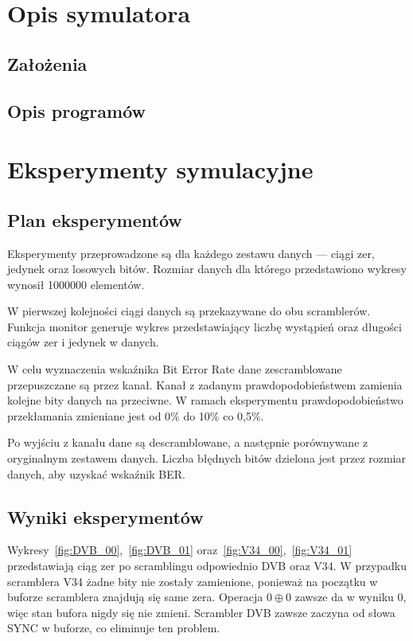 \documentclass[polish, 11pt]{article}
\begin{document}
\section{Opis symulatora}
    \subsection{Założenia}

    \subsection{Opis programów}

\section{Eksperymenty symulacyjne}
    \subsection{Plan eksperymentów}
        Eksperymenty przeprowadzone są dla każdego zestawu danych --- ciągi zer, jedynek oraz losowych bitów.
        Rozmiar danych dla którego przedstawiono wykresy wynosił 1000000 elementów.

        W pierwszej kolejności ciągi danych są przekazywane do obu scramblerów.
        Funkcja monitor generuje wykres przedstawiający liczbę wystąpień oraz długości ciągów zer i jedynek w danych.

        W celu wyznaczenia wskaźnika Bit Error Rate dane zescramblowane przepuszczane są przez kanał.
        Kanał z zadanym prawdopodobieństwem zamienia kolejne bity danych na przeciwne.
        W ramach eksperymentu prawdopodobieństwo przekłamania zmieniane jest od 0\% do 10\% co 0,5\%.

        Po wyjściu z kanału dane są descramblowane, a następnie porównywane z oryginalnym zestawem danych.
        Liczba błędnych bitów dzielona jest przez rozmiar danych, aby uzyskać wskaźnik BER.\
        
    \subsection{Wyniki eksperymentów}
        Wykresy~\ref{fig:DVB_00},~\ref{fig:DVB_01} oraz~\ref{fig:V34_00},~\ref{fig:V34_01} przedstawiają ciąg zer po scramblingu odpowiednio DVB oraz V34.
        W przypadku scramblera V34 żadne bity nie zostały zamienione, ponieważ na początku w buforze scramblera znajdują się same zera.
        Operacja \(0 \oplus 0\) zawsze da w wyniku 0, więc stan bufora nigdy się nie zmieni.
        Scrambler DVB zawsze zaczyna od słowa SYNC w buforze, co eliminuje ten problem.
\end{document}
